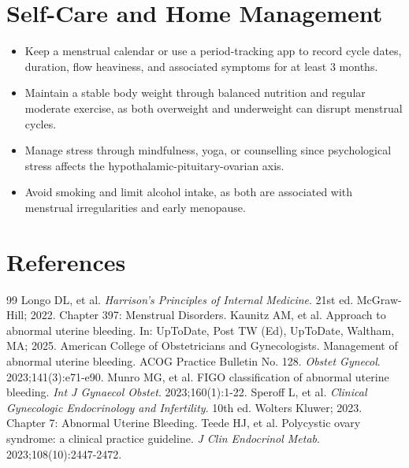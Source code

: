 \section*{Self-Care and Home Management}
\begin{itemize}
  \item Keep a menstrual calendar or use a period-tracking app to record cycle dates, duration, flow heaviness, and associated symptoms for at least 3 months.
  \item Maintain a stable body weight through balanced nutrition and regular moderate exercise, as both overweight and underweight can disrupt menstrual cycles.
  \item Manage stress through mindfulness, yoga, or counselling since psychological stress affects the hypothalamic-pituitary-ovarian axis.
  \item Avoid smoking and limit alcohol intake, as both are associated with menstrual irregularities and early menopause.
\end{itemize}

\section*{References}

\begin{thebibliography}{99}
 Longo DL, et al. \emph{Harrison's Principles of Internal Medicine}. 21st ed. McGraw-Hill; 2022. Chapter 397: Menstrual Disorders.
 Kaunitz AM, et al. Approach to abnormal uterine bleeding. In: UpToDate, Post TW (Ed), UpToDate, Waltham, MA; 2025.
 American College of Obstetricians and Gynecologists. Management of abnormal uterine bleeding. ACOG Practice Bulletin No. 128. \emph{Obstet Gynecol}. 2023;141(3):e71-e90.
 Munro MG, et al. FIGO classification of abnormal uterine bleeding. \emph{Int J Gynaecol Obstet}. 2023;160(1):1-22.
 Speroff L, et al. \emph{Clinical Gynecologic Endocrinology and Infertility}. 10th ed. Wolters Kluwer; 2023. Chapter 7: Abnormal Uterine Bleeding.
 Teede HJ, et al. Polycystic ovary syndrome: a clinical practice guideline. \emph{J Clin Endocrinol Metab}. 2023;108(10):2447-2472.
\end{thebibliography}
